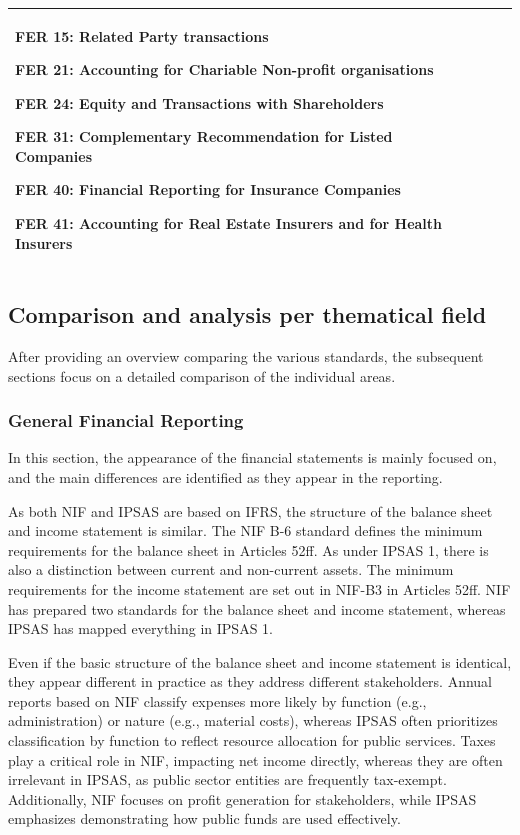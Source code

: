 \documentclass[10pt]{article}
\begin{document}
\begin{center}
\begin{longtable}{|>{\raggedright\arraybackslash}p{2.5cm}|>{\raggedright\arraybackslash}p{5cm}|>{\raggedright\arraybackslash}p{4cm}|>{\raggedright\arraybackslash}p{3cm}|}
FER 15: Related Party transactions

FER 21: Accounting for Chariable Non-profit organisations

FER 24: Equity and Transactions with Shareholders

FER 31: Complementary Recommendation for Listed Companies

FER 40: Financial Reporting for Insurance Companies

FER 41: Accounting for Real Estate Insurers and for Health Insurers

 \\
\hline
\end{longtable}
\end{center} 

\subsection{Comparison and analysis per thematical field}\label{subsec:comparison_and_analysis_per_thematical_field}
After providing an overview comparing the various standards, the subsequent sections focus on a detailed comparison of the individual areas.

\subsubsection{General Financial Reporting}\label{subsubsec:general_financial_reporting}
In this section, the appearance of the financial statements is mainly focused on, and the main differences are identified as they appear in the reporting.

As both NIF and IPSAS are based on IFRS, the structure of the balance sheet and income statement is similar. The NIF B-6 standard defines the minimum requirements for the balance sheet in Articles 52ff. As under IPSAS 1, there is also a distinction between current and non-current assets. The minimum requirements for the income statement are set out in NIF-B3 in Articles 52ff. NIF has prepared two standards for the balance sheet and income statement, whereas IPSAS has mapped everything in IPSAS 1.

Even if the basic structure of the balance sheet and income statement is identical, they appear different in practice as they address different stakeholders. Annual reports based on NIF classify expenses more likely by function (e.g., administration) or nature (e.g., material costs), whereas IPSAS often prioritizes classification by function to reflect resource allocation for public services.  Taxes play a critical role in NIF, impacting net income directly, whereas they are often irrelevant in IPSAS, as public sector entities are frequently tax-exempt. Additionally, NIF focuses on profit generation for stakeholders, while IPSAS emphasizes demonstrating how public funds are used effectively.
\end{document}
